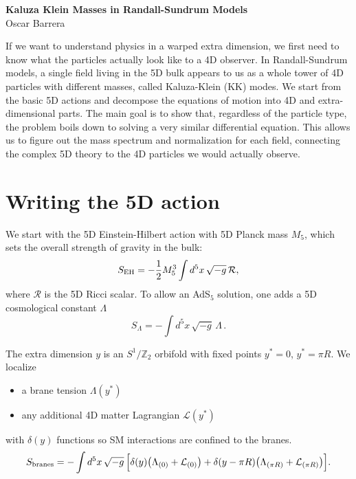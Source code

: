 \documentclass[11pt]{article}
\begin{document}
\begin{center}
{\LARGE\bfseries Kaluza Klein Masses in Randall-Sundrum Models}\\[2em]
{\Large Oscar Barrera}\\[1em]
\end{center}


\vspace{1em}

If we want to understand physics in a warped extra dimension, we first need to know what the particles actually look like to a 4D observer. In Randall-Sundrum models, a single field living in the 5D bulk appears to us as a whole tower of 4D particles with different masses, called Kaluza-Klein (KK) modes. We start from the basic 5D actions and decompose the equations of motion into 4D and extra-dimensional parts. The main goal is to show that, regardless of the particle type, the problem boils down to solving a very similar differential equation. This allows us to figure out the mass spectrum and normalization for each field, connecting the complex 5D theory to the 4D particles we would actually observe.


\setcounter{tocdepth}{2}
\tableofcontents

\vspace{1em}


\section{Writing the 5D action}

We start with the 5D Einstein-Hilbert action with 5D Planck mass $M_5$, which sets the overall
strength of gravity in the bulk:
\begin{equation}
S_{\rm EH}
= -\frac{1}{2} M_5^{3}\int d^{5}x\,\sqrt{-g}\,\mathcal{R},
\end{equation}
where $\mathcal{R}$ is the 5D Ricci scalar. To allow an AdS$_5$ solution, one adds a 5D cosmological constant $\Lambda$
\begin{equation}
S_{\Lambda} = -\int d^{5}x\,\sqrt{-g}\,\Lambda \, .
\end{equation}

The extra dimension $y$ is an $S^{1}/\mathbb{Z}_{2}$ orbifold with fixed points
$y^{\ast}=0$, $y^{\ast}=\pi R$. We localize
\begin{itemize}
\item a brane tension $\Lambda(y^{\ast})$
\item any additional 4D matter Lagrangian $\mathcal{L}(y^{\ast})$
\end{itemize}
with $\delta(y)$ functions so SM interactions are confined to the branes.
\begin{equation}
S_{\rm branes}
= -\int d^{5}x\,\sqrt{-g}\,\Big[
\delta(y)\big(\Lambda_{(0)}+\mathcal{L}_{(0)}\big)
+ \delta(y-\pi R)\big(\Lambda_{(\pi R)}+\mathcal{L}_{(\pi R)}\big)
\Big] .
\end{equation}
\end{document}

